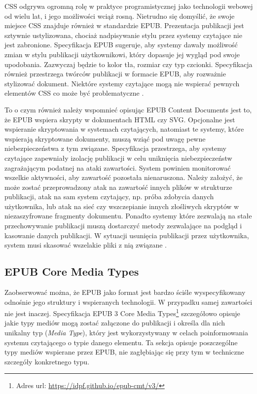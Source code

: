 CSS odgrywa ogromną rolę w praktyce programistycznej jako technologii webowej od wielu lat, i jego możliwości wciąż rosną. Nietrudno się domyślić, że swoje miejsce CSS znajduje również w standardzie EPUB. Prezentacja publikacji jest sztywnie ustylizowana, chociaż nadpisywanie stylu przez systemy czytające nie jest zabronione. Specyfikacja EPUB sugeruje, aby systemy dawały możliwość zmian w stylu publikacji użytkownikowi, który dopasuje jej wygląd pod swoje upodobania. Zazwyczaj będzie to kolor tła, rozmiar czy typ czcionki. Specyfikacja również przestrzega twórców publikacji w formacie EPUB, aby rozważnie stylizować dokument. Niektóre systemy czytające mogą nie wspierać pewnych elementów CSS co może być problematyczne \cite{EPUBContentDocumentsSpecification}.

To o czym również należy wspomnieć opisując EPUB Content Documents jest to, że EPUB wspiera skrypty w dokumentach HTML czy SVG. Opcjonalne jest wspieranie skryptowania w systemach czytających, natomiast te systemy, które wspierają skryptowane dokumenty, muszą wziąć pod uwagę pewne niebezpieczeństwa z tym związane. Specyfikacja przestrzega, aby systemy czytające zapewniały izolację publikacji w celu uniknięcia niebezpieczeństw zagrażającym podatnej na ataki zawartości. System powinien monitorować wszelkie aktywności, aby zawartość pozostała nienaruszona. Należy założyć, że może zostać przeprowadzony atak na zawartość innych plików w strukturze publikacji, atak na sam system czytający, np. próba zdobycia danych użytkownika, lub atak na sieć czy wszczepianie innych złośliwych skryptów w niezaszyfrowane fragmenty dokumentu. Ponadto systemy które zezwalają na stałe przechowywanie publikacji muszą dostarczyć metody zezwalające na podgląd i kasowanie danych publikacji. W sytuacji usunięcia publikacji przez użytkownika, system musi skasować wszelakie pliki z nią związane \cite{EPUBContentDocumentsSpecification}.

\subsection{EPUB Core Media Types}

Zaobserwować można, że EPUB jako format jest bardzo ściśle wyspecyfikowany odnośnie jego struktury i wspieranych technologii. W przypadku samej zawartości nie jest inaczej. Specyfikacja EPUB 3 Core Media Types\footnote{Adres url: \href{https://idpf.github.io/epub-cmt/v3/}{https://idpf.github.io/epub-cmt/v3/}} szczegółowo opisuje jakie typy mediów mogą zostać załączone do publikacji i określa dla nich unikalny typ (\textit{Media Type}), który jest wykorzystywany w celach poinformowania systemu czytającego o typie danego elementu. Ta sekcja opisuje poszczególne typy mediów wspierane przez EPUB, nie zagłębiając się przy tym w techniczne szczegóły konkretnego typu.

